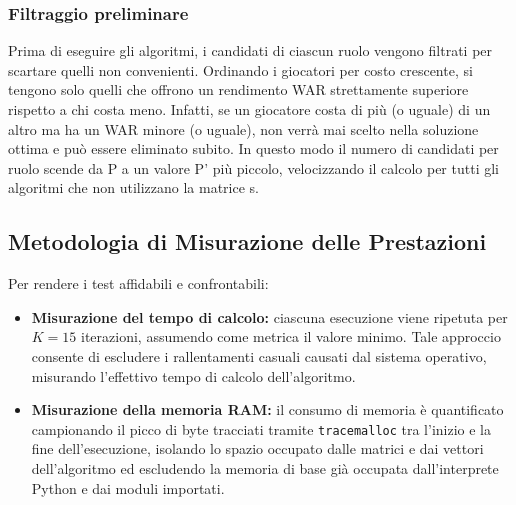 \subsubsection{Filtraggio preliminare}
Prima di eseguire gli algoritmi, i candidati di ciascun ruolo vengono filtrati per scartare quelli non convenienti. Ordinando i giocatori per costo crescente, si tengono solo quelli che offrono un rendimento WAR strettamente superiore rispetto a chi costa meno. Infatti, se un giocatore costa di più (o uguale) di un altro ma ha un WAR minore (o uguale), non verrà mai scelto nella soluzione ottima e può essere eliminato subito. In questo modo il numero di candidati per ruolo scende da P a un valore P' più piccolo, velocizzando il calcolo per tutti gli algoritmi che non utilizzano la matrice s.

\subsection{Metodologia di Misurazione delle Prestazioni}
Per rendere i test affidabili e confrontabili:
\begin{itemize}
	\item \textbf{Misurazione del tempo di calcolo:} ciascuna esecuzione viene ripetuta per $K = 15$ iterazioni, assumendo come metrica il valore minimo. Tale approccio consente di escludere i rallentamenti casuali causati dal sistema operativo, misurando l'effettivo tempo di calcolo dell'algoritmo.
	\item \textbf{Misurazione della memoria RAM:} il consumo di memoria è quantificato campionando il picco di byte tracciati tramite \texttt{tracemalloc} tra l'inizio e la fine dell'esecuzione, isolando lo spazio occupato dalle matrici e dai vettori dell'algoritmo ed escludendo la memoria di base già occupata dall'interprete Python e dai moduli importati.
\end{itemize}
